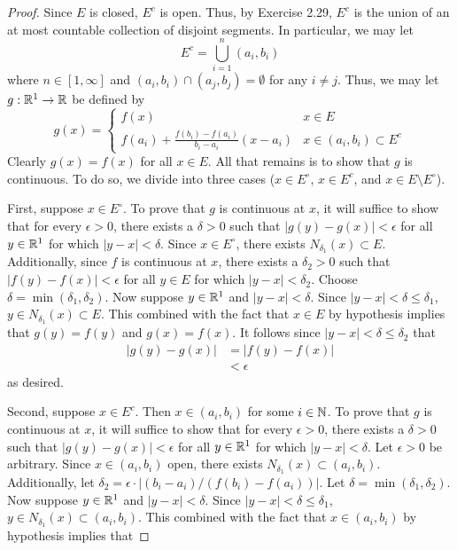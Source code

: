 \documentclass[../psets.tex]{subfiles}
\begin{document}
\begin{enumerate}[label={\textbf{\arabic*.}}]
    \begin{proof}
        Since $E$ is closed, $E^c$ is open. Thus, by Exercise 2.29, $E^c$ is the union of an at most countable collection of disjoint segments. In particular, we may let
        \begin{equation*}
            E^c = \bigcup_{i=1}^n(a_i,b_i)
        \end{equation*}
        where $n\in[1,\infty]$ and $(a_i,b_i)\cap(a_j,b_j)=\emptyset$ for any $i\neq j$. Thus, we may let $g:\mathbb{R}^1\to\mathbb{R}$ be defined by
        \begin{equation*}
            g(x) =
            \begin{cases}
                f(x) & x\in E\\
                f(a_i)+\frac{f(b_i)-f(a_i)}{b_i-a_i}(x-a_i) & x\in (a_i,b_i)\subset E^c
            \end{cases}
        \end{equation*}
        Clearly $g(x)=f(x)$ for all $x\in E$. All that remains is to show that $g$ is continuous. To do so, we divide into three cases ($x\in E^\circ$, $x\in E^c$, and $x\in E\setminus E^\circ$).\par\smallskip
        First, suppose $x\in E^\circ$. To prove that $g$ is continuous at $x$, it will suffice to show that for every $\epsilon>0$, there exists a $\delta>0$ such that $|g(y)-g(x)|<\epsilon$ for all $y\in\mathbb{R}^1$ for which $|y-x|<\delta$. Since $x\in E^\circ$, there exists $N_{\delta_1}(x)\subset E$. Additionally, since $f$ is continuous at $x$, there exists a $\delta_2>0$ such that $|f(y)-f(x)|<\epsilon$ for all $y\in E$ for which $|y-x|<\delta_2$. Choose $\delta=\min(\delta_1,\delta_2)$. Now suppose $y\in\mathbb{R}^1$ and $|y-x|<\delta$. Since $|y-x|<\delta\leq\delta_1$, $y\in N_{\delta_1}(x)\subset E$. This combined with the fact that $x\in E$ by hypothesis implies that $g(y)=f(y)$ and $g(x)=f(x)$. It follows since $|y-x|<\delta\leq\delta_2$ that
        \begin{align*}
            |g(y)-g(x)| &= |f(y)-f(x)|\\
            &< \epsilon
        \end{align*}
        as desired.\par\smallskip
        Second, suppose $x\in E^c$. Then $x\in(a_i,b_i)$ for some $i\in\mathbb{N}$. To prove that $g$ is continuous at $x$, it will suffice to show that for every $\epsilon>0$, there exists a $\delta>0$ such that $|g(y)-g(x)|<\epsilon$ for all $y\in\mathbb{R}^1$ for which $|y-x|<\delta$. Let $\epsilon>0$ be arbitrary. Since $x\in(a_i,b_i)$ open, there exists $N_{\delta_1}(x)\subset(a_i,b_i)$. Additionally, let $\delta_2=\epsilon\cdot|(b_i-a_i)/(f(b_i)-f(a_i))|$. Let $\delta=\min(\delta_1,\delta_2)$. Now suppose $y\in\mathbb{R}^1$ and $|y-x|<\delta$. Since $|y-x|<\delta\leq\delta_1$, $y\in N_{\delta_1}(x)\subset(a_i,b_i)$. This combined with the fact that $x\in(a_i,b_i)$ by hypothesis implies that

\end{proof}
\end{enumerate}
\end{document}
